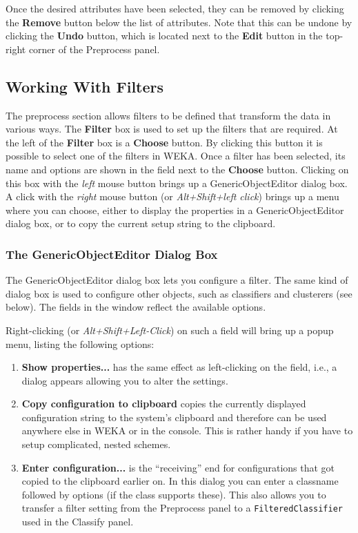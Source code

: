 \documentclass[a4paper]{article}
\begin{document}
Once the desired attributes have been selected, they can be removed by
clicking the \textbf{Remove} button below the list of attributes.
Note that this can be undone by clicking the \textbf{Undo} button,
which is located next to the \textbf{Edit} button in the top-right
corner of the Preprocess panel.

\subsection{Working With Filters}

\begin{center}
\end{center}

The preprocess section allows filters to be defined that transform the
data in various ways.  The \textbf{Filter} box is used to set up the
filters that are required.  At the left of the \textbf{Filter} box is
a \textbf{Choose} button. By clicking this button it is possible to
select one of the filters in WEKA. Once a filter has been selected,
its name and options are shown in the field next to the
\textbf{Choose} button. Clicking on this box with the \textit{left} mouse button
brings up a GenericObjectEditor dialog box. A click with the \textit{right}
mouse button (or \textit{Alt+Shift+left click}) brings up a menu where you can
choose, either to display the properties in a GenericObjectEditor dialog
box, or to copy the current setup string to the clipboard.

\subsubsection*{The GenericObjectEditor Dialog Box}

The GenericObjectEditor dialog box lets you configure a filter. The
same kind of dialog box is used to configure other objects, such as
classifiers and clusterers (see below). The fields in the window
reflect the available options.

Right-clicking (or \textit{Alt+Shift+Left-Click}) on such a field 
will bring up a popup menu, listing the following options:
\begin{enumerate}
  \item \textbf{Show properties...} has the same effect as left-clicking
  on the field, i.e., a dialog appears allowing you to alter the settings.
  \item \textbf{Copy configuration to clipboard} copies the currently
  displayed configuration string to the system's clipboard and therefore 
  can be used anywhere else in WEKA or in the console. This is rather handy
  if you have to setup complicated, nested schemes.
  \item \textbf{Enter configuration...} is the ``receiving'' end for
  configurations that got copied to the clipboard earlier on. In this dialog you
  can enter a classname followed by options (if the class supports these).
  This also allows you to transfer a filter setting from the Preprocess
  panel to a \texttt{FilteredClassifier} used in the Classify panel.
\end{enumerate}
\end{document}
